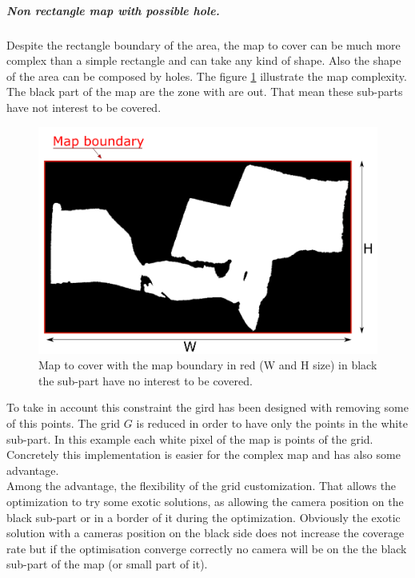  \subparagraph{Non rectangle map with possible hole.}
Despite the rectangle boundary of the area, the map to cover can be much more complex than a simple rectangle and can take any kind of shape. Also the shape of the area can be composed by holes. The figure \ref{fig:boundaryMap} illustrate the map complexity. The black part of the map are the zone with are out. That mean these sub-parts have not interest to be covered.
 \begin{figure}[t!]
 \begin{center}
   \includegraphics[width=\linewidth]{img/BoundaryMap2.png}
  \caption{Map to cover with the map boundary in red (W and H size) in black the sub-part have no interest to  be covered.   }\label{fig:boundaryMap}
  \endminipage\hfill
  \end{center}
\end{figure}
To take in account this constraint the gird has been designed with removing some of this points.
The grid $G$ is reduced in order to have only the points in the white sub-part. In this example each white pixel of the map is points of the grid. 
Concretely this implementation is easier for the complex map and has also some advantage. \\
Among the advantage, the flexibility of the grid customization. That allows the optimization to try some exotic solutions, as allowing the camera  position on the black sub-part or in a border of it during the optimization.  Obviously the exotic solution with a cameras position on the black side does not increase the coverage rate  but if the optimisation converge correctly no camera will be on the the black sub-part of the map (or small part of it).


